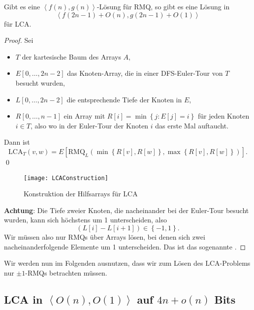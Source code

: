 \begin{lemma}
  Gibt es eine \( \left\langle f(n),g(n) \right\rangle \)-Lösung für RMQ, so gibt es eine Lösung in
  \begin{equation*}
    \left\langle f(2n-1)+O(n),g(2n-1)+O(1) \right\rangle
  \end{equation*}
  für LCA.
  \begin{proof}
    Sei
    \begin{itemize}
      \item \( T \) der kartesische Baum des Arrays \( A \),
      \item \( E[0,\dots,2n-2] \) das Knoten-Array, die in einer DFS-Euler-Tour von \( T \) besucht wurden,
      \item \( L[0,\dots,2n-2] \) die entsprechende Tiefe der Knoten in \( E \),
      \item \( R[0,\dots,n-1] \) ein Array mit \( R[i] = \min\left \{ j : E[j] = i \right \} \) für jeden Knoten \( i \in T \), also wo in der Euler-Tour der Knoten \( i \) das erste Mal auftaucht.
    \end{itemize}
    Dann ist
    \begin{equation*}
      \text{LCA}_T(v,w) = E[\text{RMQ}_L(\min\left \{ R[v],R[w] \right \}, \max\left \{ R[v],R[w] \right \})]\text{.}
    \end{equation*} \qed \\
    \begin{figure}[H]
      \texttt{[image: LCAConstruction]}
      \caption{Konstruktion der Hilfsarrays für LCA}
    \end{figure}
    \textcolor{red!80!black}{\textbf{Achtung}}: Die Tiefe zweier Knoten, die nacheinander bei der Euler-Tour besucht wurden, kann sich höchstens um 1 unterscheiden, also
    \begin{equation*}
      (L[i]-L[i+1]) \in \left \{ -1,1 \right \}\text{.}
    \end{equation*}
    Wir müssen also nur RMQs über Arrays lösen, bei denen sich zwei nacheinanderfolgende Elemente um 1 unterscheiden. Das ist das sogenannte .
  \end{proof}
\end{lemma}

Wir werden nun im Folgenden ausnutzen, dass wir zum Lösen des LCA-Problems nur \( \pm 1 \)-RMQs betrachten müssen.

\subsection{LCA in \( \left\langle O(n),O(1) \right\rangle \) auf \( 4n+o(n) \) Bits}

